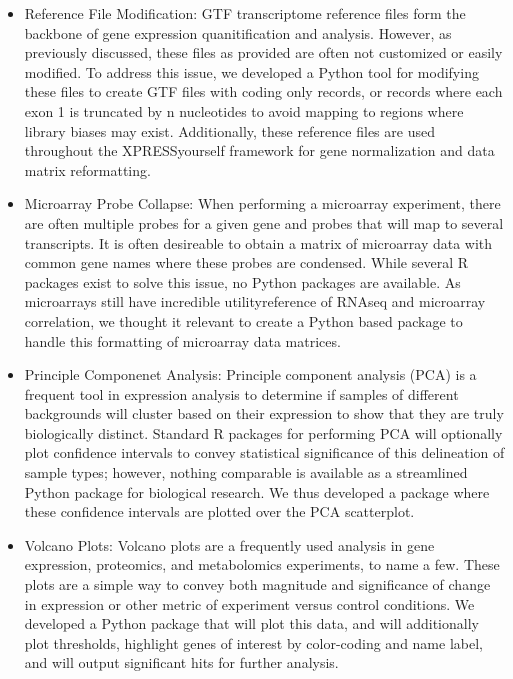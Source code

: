 \documentclass[11pt, a4paper, oneside]{article}
\begin{document}
\begin{itemize}
  \item Reference File Modification: GTF transcriptome reference files form the backbone of gene expression quanitification and analysis. However, as previously discussed, these files as provided are often not customized or easily modified. To address this issue, we developed a Python tool for modifying these files to create GTF files with coding only records, or records where each exon 1 is truncated by n nucleotides to avoid mapping to regions where library biases may exist. Additionally, these reference files are used throughout the XPRESSyourself framework for gene normalization and data matrix reformatting.
  \item Microarray Probe Collapse: When performing a microarray experiment, there are often multiple probes for a given gene and probes that will map to several transcripts. It is often desireable to obtain a matrix of microarray data with common gene names where these probes are condensed. While several R packages exist to solve this issue{}, no Python packages are available. As microarrays still have incredible utility{reference of RNAseq and microarray correlation}, we thought it relevant to create a Python based package to handle this formatting of microarray data matrices.
  \item Principle Componenet Analysis: Principle component analysis (PCA) is a frequent tool in expression analysis to determine if samples of different backgrounds will cluster based on their expression to show that they are truly biologically distinct. Standard R packages for performing PCA will optionally plot confidence intervals to convey statistical significance of this delineation of sample types; however, nothing comparable is available as a streamlined Python package for biological research. We thus developed a package where these confidence intervals are plotted over the PCA scatterplot.
  \item Volcano Plots: Volcano plots are a frequently used analysis in gene expression, proteomics, and metabolomics experiments, to name a few. These plots are a simple way to convey both magnitude and significance of change in expression or other metric of experiment versus control conditions. We developed a Python package that will plot this data, and will additionally plot thresholds, highlight genes of interest by color-coding and name label, and will output significant hits for further analysis.
\end{itemize}
\end{document}
